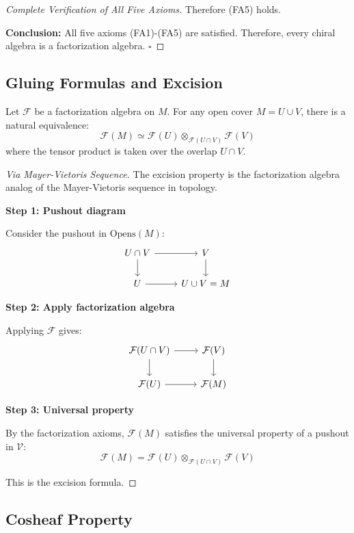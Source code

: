\begin{proof}[Complete Verification of All Five Axioms]
Therefore (FA5) holds.

\textbf{Conclusion:} All five axioms (FA1)-(FA5) are satisfied. Therefore, every 
chiral algebra is a factorization algebra. $\square$
\end{proof}

\subsection{Gluing Formulas and Excision}

\begin{theorem}
\label{thm:excision-factorization}
Let $\mathcal{F}$ be a factorization algebra on $M$. For any open cover 
$M = U \cup V$, there is a natural equivalence:
$$\mathcal{F}(M) \simeq \mathcal{F}(U) \otimes_{\mathcal{F}(U \cap V)} \mathcal{F}(V)$$
where the tensor product is taken over the overlap $U \cap V$.
\end{theorem}

\begin{proof}[Via Mayer-Vietoris Sequence]
The excision property is the factorization algebra analog of the Mayer-Vietoris 
sequence in topology.

\textbf{Step 1: Pushout diagram}

Consider the pushout in $\text{Opens}(M)$:
$$\begin{tikzcd}
U \cap V \arrow[r] \arrow[d] & V \arrow[d] \\
U \arrow[r] & U \cup V = M
\end{tikzcd}$$

\textbf{Step 2: Apply factorization algebra}

Applying $\mathcal{F}$ gives:
$$\begin{tikzcd}
\mathcal{F}(U \cap V) \arrow[r] \arrow[d] & \mathcal{F}(V) \arrow[d] \\
\mathcal{F}(U) \arrow[r] & \mathcal{F}(M)
\end{tikzcd}$$

\textbf{Step 3: Universal property}

By the factorization axioms, $\mathcal{F}(M)$ satisfies the universal property of 
a pushout in $\mathcal{V}$:
$$\mathcal{F}(M) = \mathcal{F}(U) \otimes_{\mathcal{F}(U \cap V)} \mathcal{F}(V)$$

This is the excision formula.
\end{proof}

\subsection{Cosheaf Property}

